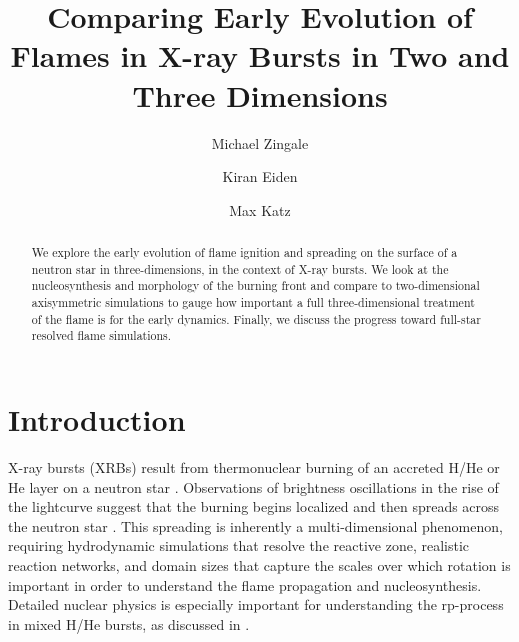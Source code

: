\documentclass[twocolumn,linenumbers,times,tighten]{aastex631}
\begin{document}
\title{Comparing Early Evolution of Flames in X-ray Bursts in Two and Three Dimensions}


\author[0000-0001-8401-030X]{Michael Zingale}

\author[0000-0001-6191-4285]{Kiran Eiden}

\author[0000-0003-0439-4556]{Max Katz}




\begin{abstract}
We explore the early evolution of flame ignition and spreading on the
surface of a neutron star in three-dimensions, in the context of X-ray
bursts.  We look at the nucleosynthesis and morphology of the burning
front and compare to two-dimensional axisymmetric simulations to gauge
how important a full three-dimensional treatment of the flame is for
the early dynamics.  Finally, we discuss the progress toward full-star
resolved flame simulations.\end{abstract}


\section{Introduction}\label{Sec:Introduction}

X-ray bursts (XRBs) result from thermonuclear burning of an accreted
H/He or He layer on a neutron star \citep{galloway:2017}.
Observations of brightness oscillations in the rise of the lightcurve
suggest that the burning begins localized and then spreads across the
neutron star \citep{bhattacharyya:2007}. 
This spreading is inherently
a multi-dimensional phenomenon, requiring hydrodynamic simulations that
resolve the reactive zone, realistic reaction networks, and
domain sizes that capture the scales over which rotation is important in order to
understand the flame propagation and nucleosynthesis.  Detailed
nuclear physics is especially important for understanding the 
rp-process in mixed H/He bursts, as discussed in \citet{rpprocess}.
\end{document}

